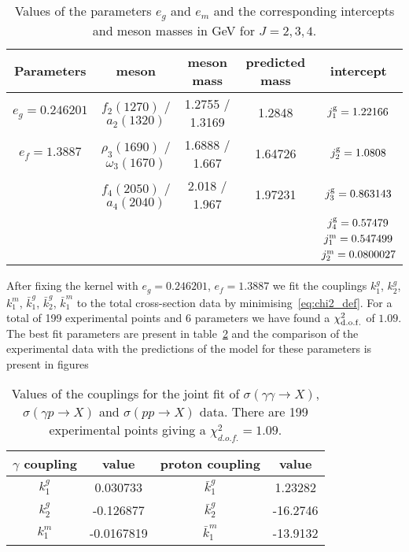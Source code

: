 \documentclass[a4paper,12pt]{article}
\begin{document}
\begin{table}[t!]
\centering
\caption{Values of the parameters $e_g$ and $e_m$ and the corresponding intercepts and meson masses in GeV for $J=2,3,4$.}
\vspace{0.5cm}
\begin{tabular}{|c|c|c|c|c|}
\hline
Parameters & meson  & meson mass & predicted mass & intercept  \\
\hline
$e_g = 0.246201$ & $f_2(1270)$ / $a_2(1320)$ & 1.2755 / 1.3169 & 1.2848 & $j^{\rm{g}}_1 = 1.22166$  \\
\hline
$e_f = 1.3887$  & $\rho_3(1690)$ / $\omega_3(1670)$ & 1.6888 / 1.667 & 1.64726 & $j^{\rm{g}}_2 = 1.0808$\\
\hline
& $f_4(2050)$ / $a_4(2040)$ & 2.018 / 1.967 & 1.97231 & $j^{\rm{g}}_3 = 0.863143$ \\
\hline
 & & & & $j^{\rm{g}}_4 = 0.57479$ \\
\hline
 & & & & $j^{\rm{m}}_1 = 0.547499$ \\
\hline
 & & & & $j^{\rm{m}}_2 = 0.0800027$ \\
\hline
\end{tabular}
\label{table:regge_traj}
\end{table}

After fixing the kernel with $e_g = 0.246201$, $e_f = 1.3887$ we fit the couplings $k^{g}_1$, $k^{g}_2$, $k^{m}_1$,  $\bar{k}^{g}_1$, $\bar{k}^{g}_2$, $\bar{k}^{m}_1$ to the total cross-section data by minimising~\ref{eq:chi2_def}. For a total of 199 experimental points and 6 parameters we have found a $\chi^2_{\rm d.o.f.}$ of $1.09$. The best fit parameters are present in table~\ref{table:best_fit_pars_all_sigma} and the comparison of the experimental data with the predictions of the model for these parameters is present in figures
\begin{table}[t!]
\centering
\caption{Values of the couplings for the joint fit of $\sigma\left(\gamma \gamma \to X\right)$, $\sigma\left(\gamma p \to X\right)$ and $\sigma\left(p p \to X\right)$ data. There are 199 experimental points giving a  $\chi^2_{d.o.f.}=1.09$.}
\vspace{0.5cm}
\begin{tabular}{|c|c|c|c|}
\hline
$\gamma$ coupling & value & proton coupling & value  \\
\hline
$k^{g}_1$ & 0.030733 & $\bar{k}^{g}_1$ & 1.23282 \\
\hline
$k^{g}_2$ & -0.126877 & $\bar{k}^{g}_2$ & -16.2746 \\
\hline
$k^{m}_1$ & -0.0167819 & $\bar{k}^{m}_1$ & -13.9132  \\
\hline
\end{tabular}
\label{table:best_fit_pars_all_sigma}
\end{table}
\end{document}
